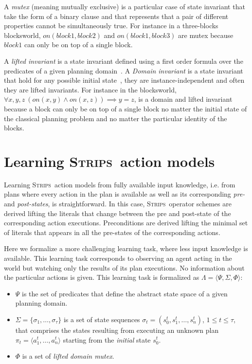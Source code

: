 \documentclass{article}
\newcommand{\tup}[1]{{\langle #1 \rangle}}
\newcommand{\strips}{\textsc{Strips}}     %
\begin{document}
A {\em mutex} (meaning mutually exclusive) is a particular case of state invariant that take the form of a binary clause and that represents that a pair of different properties cannot be simultaneously true. For instance in a three-blocks blocksworld, $on(block1,block2)$ and $on(block1,block3)$ are mutex because $block1$ can only be on top of a single block.

A {\em lifted invariant} is a state invariant defined using a first order formula over the predicates of a given planning domain~\cite{rintanen:schematicInvariants:AAAI2017}. A {\em Domain invariant} is a state invariant that hold for any possible initial state~\cite{kautz:mutex:IJCAI1999}, they are instance-independent and often they are lifted invariants.  For instance in the blocksworld, $\forall x,y,z\ (on(x,y)\wedge on(x,z)) \implies y=z$, is a domain and lifted invariant because a block can only be on top of a single block no matter the initial state of the classical planning problem and no matter the particular identity of the blocks.


\section{Learning \strips\ action models}
Learning \strips\ action models from fully available input knowledge, i.e. from plans where every action in the plan is available as well as its corresponding {\em pre-} and {\em post-states}, is straightforward. In this case, \strips\ operator schemes are derived lifting the literals that change between the pre and post-state of the corresponding action executions. Preconditions are derived lifting the minimal set of literals that appears in all the pre-states of the corresponding actions.

Here we formalize a more challenging learning task, where less input knowledge is available. This learning task corresponds to observing an agent acting in the world but watching only the results of its plan executions. No information about the particular actions is given. This learning task is formalized as $\Lambda=\tup{\Psi,\Sigma,\Phi}$:
\begin{itemize}
\item $\Psi$ is the set of predicates that define the abstract state space of a given planning domain.
\item $\Sigma=\{\sigma_1,\ldots,\sigma_{\tau}\}$ is a set of state sequences $\sigma_t=(s_0^t,s_1^t,\ldots,s_{n}^t)$, {\tt\small $1\leq t\leq \tau$}, that comprises the states resulting from executing an unknown plan $\pi_t=\tup{a_1^t, \ldots, a_n^t}$ starting from the {\em initial} state $s_0^t$.
\item $\Phi$ is a set of {\em lifted domain mutex}.
\end{itemize}
\end{document}
